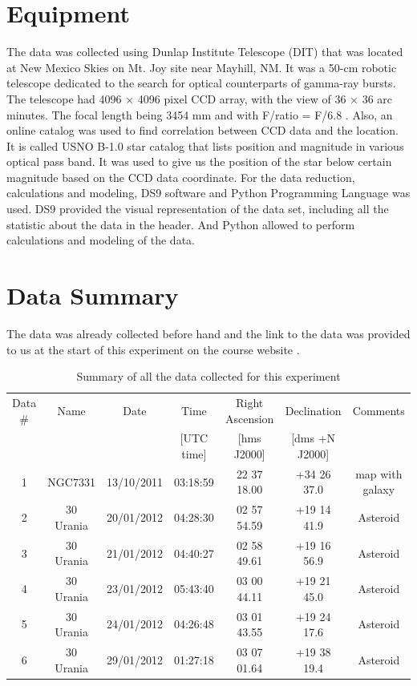 \documentclass[a4paper,12pt]{article}
\begin{document}
\section{Equipment}
\label{sec:equipment}
The data was collected using Dunlap Institute Telescope (DIT) that was located at New Mexico Skies on Mt. Joy site near Mayhill, NM. It was a 50-cm robotic telescope dedicated to the search for optical counterparts of gamma-ray bursts. The telescope had 4096 $\times$ 4096 pixel CCD array, with the view of 36 $\times$ 36 arc minutes. The focal length being 3454 mm and with F/ratio = F/6.8 \cite{instructions}. Also, an online catalog was used to find correlation between CCD data and the location. It is called USNO B-1.0 star catalog that lists position and magnitude in various optical pass band. It was used to give us the position of the star below certain magnitude based on the CCD data coordinate.  For the data reduction, calculations and modeling, DS9 software and Python Programming Language was used. DS9 provided the visual representation of the data set, including all the statistic about the data in the header. And Python allowed to perform calculations and modeling of the data. 

\section{Data Summary}
\label{sec:data}

The data was already collected before hand and the link to the data was provided to us at the start of this experiment on the course website \cite{instructions}. 


\begin{table}[H]
\centering %
\caption{Summary of all the data collected for this experiment}
\footnotesize

\begin{tabular}{ccccccc}%
\hline
\hline
Data \# & Name & Date & Time & Right Ascension& Declination &Comments \\
& &  &[UTC time]&[hms J2000]&[dms +N J2000]&\\
\hline
\hline
1   &   NGC7331   &   13/10/2011  &03:18:59 &22 37 18.00&+34 26 37.0&map with galaxy\\
2   &   30 Urania    & 20/01/2012   &04:28:30&02 57 54.59&+19 14 41.9& Asteroid\\
3   &   30 Urania     &  21/01/2012   &04:40:27&02 58 49.61&+19 16 56.9&Asteroid \\
4   &    30 Urania   &23/01/2012    &05:43:40 &03 00 44.11&+19 21 45.0&Asteroid \\
5   &   30 Urania    & 24/01/2012    &04:26:48&03 01 43.55&+19 24 17.6& Asteroid\\
6   &  30 Urania  &  29/01/2012   &01:27:18 &03 07 01.64&+19 38 19.4&Asteroid \\
\hline
\hline

\end{tabular}
\label{table:dataset} %
\end{table}
\end{document}
